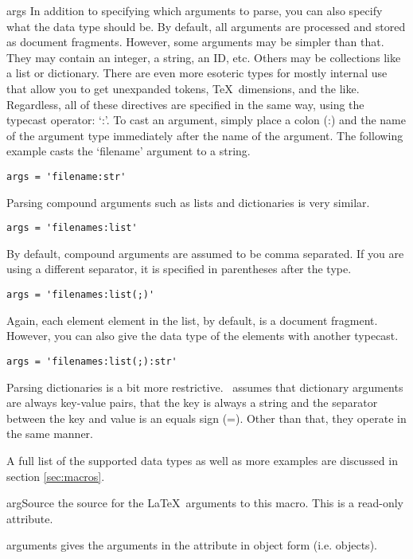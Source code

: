 \begin{memberdesc}[Macro]{args}
In addition to specifying which arguments to parse, you can also specify 
what the data type should be. 
By default, all arguments are processed and stored as document fragments.
However, some arguments may be simpler than that.  They may contain an integer,
a string, an ID, etc.  Others may be collections like a list or dictionary.
There are even more esoteric types for mostly internal use that allow you to
get unexpanded tokens, \TeX\ dimensions, and the like.  Regardless, all of 
these directives are specified in the same way, using the typecast operator:
`:'.  To cast an argument, simply place a colon (:) and the name of the 
argument type immediately after the name of the argument.  The following example
casts the `filename' argument to a string.
\begin{verbatim}
args = 'filename:str'
\end{verbatim}

Parsing compound arguments such as lists and dictionaries is very similar.
\begin{verbatim}
args = 'filenames:list'
\end{verbatim}
By default, compound arguments are assumed to be comma separated.  If you
are using a different separator, it is specified in parentheses after the type.
\begin{verbatim}
args = 'filenames:list(;)'
\end{verbatim}
Again, each element element in the list, by default, is a document fragment.
However, you can also give the data type of the elements with another typecast.
\begin{verbatim}
args = 'filenames:list(;):str'
\end{verbatim}

Parsing dictionaries is a bit more restrictive.  \plasTeX\ assumes that 
dictionary arguments are always key-value pairs, that the key is always
a string and the separator between the key and value is an equals sign (=).  
Other than that, they operate in the same manner.

A full list of the supported data types as well as more examples are
discussed in section \ref{sec:macros}.
\end{memberdesc}

\begin{memberdesc}[Macro]{argSource}
the source for the \LaTeX\ arguments to this macro.  This is a read-only 
attribute.
\end{memberdesc}

\begin{memberdesc}[Macro]{arguments}
gives the arguments in the  attribute in object form 
(i.e.  objects).
\end{memberdesc}

